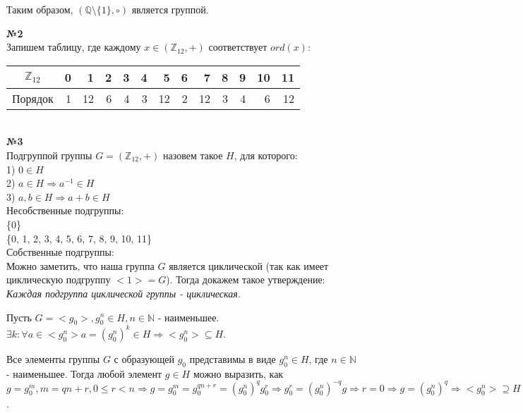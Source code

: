 \documentclass[a4paper, 12pt]{article}
\begin{document}
	Таким образом, $(\mathbb{Q}\setminus\{1\}, \circ)$ является группой.
	\newline

	\textbf{№2} \\
	
	Запишем таблицу, где каждому $x \in (\mathbb{Z}_{12}, +)$ соответствует $ord(x)$: \\
	
	\begin{tabular}{|c|rrrrrrrrrrrr|} \hline
		$\mathbb{Z}_{12}$ & 0 & 1 & 2 & 3 & 4 & 5 & 6 & 7 & 8 & 9 & 10 & 11 \\ \hline
		Порядок & 1 & 12 & 6 & 4 & 3 & 12 & 2 & 12 & 3 & 4 & 6 & 12 \\ \hline
	\end{tabular}
	\newline \\
	
	\textbf{№3} \\
	
	Подгруппой группы $G = (\mathbb{Z}_{12}, +)$ назовем такое $H$, для которого:\\
	1) $0 \in H$ \\
	2) $a \in H \Rightarrow a^{-1} \in H$ \\
	3) $a, b \in H \Rightarrow a + b \in H$ \\
	
	Несобственные подгруппы: \\
	\{0\} \\
	\{0, 1, 2, 3, 4, 5, 6, 7, 8, 9, 10, 11\} \\
	
	Собственные подгруппы: \\
	
	Можно заметить, что наша группа $G$ является циклической (так как имеет циклическую подгруппу $<1> = G$). Тогда докажем такое утверждение: \\
	\textit{Каждая подгруппа циклической группы - циклическая.}
	
	Пусть $G = <g_0>, g_0^n \in H, n \in \mathbb{N}$ - наименьшее. $\exists k: \forall a \in <g_0^n> a = (g_0^n)^k \in H \Rightarrow <g_0^n> \subseteq H$.
	\newline
	\newline
	
	Все элементы группы $G$ с образующей $g_0$ представимы в виде $ g_0^n \in H $, где $n \in \mathbb{N}$ - наименьшее. Тогда любой элемент $g \in H$ можно выразить, как $g = g_0^m, m = qn + r, 0 \leq r < n \Rightarrow g = g_0^m = g_0^{qn + r} = (g_0^n)^qg_0^r \Rightarrow g_0^r = (g_0^n)^{-q}g \Rightarrow r = 0 \Rightarrow g = (g_0^n)^q \Rightarrow <g_0^n> \supseteq H$.
	
\end{document}

